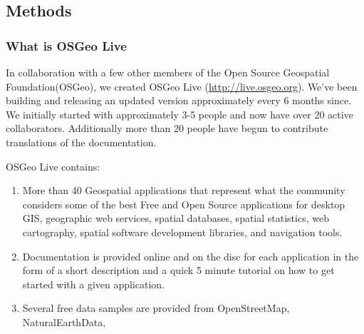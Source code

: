 \documentclass[12pt,letterpaper]{article}
\begin{document}
%


\subsection{Methods}
\subsubsection{What is OSGeo Live}
In collaboration with a few other members of the Open Source Geospatial Foundation(OSGeo), we created OSGeo Live (\url{http://live.osgeo.org}). We've been building and releasing an updated version approximately every 6 months since. We initially started with approximately 3-5 people and now have over 20 active collaborators. Additionally more than 20 people have begun to contribute translations of the documentation.  

OSGeo Live contains:
\begin{enumerate}
\item More than 40 Geospatial applications that represent what the community considers some of the best Free and Open Source applications for desktop GIS, geographic web services, spatial databases, spatial statistics, web cartography, spatial software development libraries, and navigation tools.
\item Documentation is provided online and on the disc for each application in the form of a short description and a quick 5 minute tutorial on how to get started with a given application.
\item Several free data samples are provided from OpenStreetMap, NaturalEarthData, 
\end{enumerate}
\end{document}
